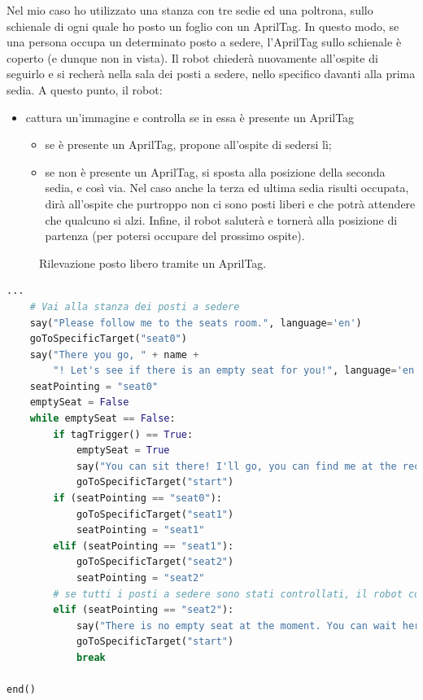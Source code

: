 \documentclass[italian, twoside]{sapthesis} %
\begin{document}
Nel mio caso ho utilizzato una stanza con tre sedie ed una poltrona, sullo schienale di ogni quale ho posto un foglio con un AprilTag. In questo modo, se una persona occupa un determinato posto a sedere, l'AprilTag sullo schienale è coperto (e dunque non in vista). Il robot chiederà nuovamente all'ospite di seguirlo e si recherà nella sala dei posti a sedere, nello specifico davanti alla prima sedia. A questo punto, il robot:
\begin{itemize}
    \item cattura un'immagine e controlla se in essa è presente un AprilTag
	\begin{itemize}
	    \item se è presente un AprilTag, propone all'ospite di sedersi lì;
        \item se non è presente un AprilTag, si sposta alla posizione della seconda sedia, e così via. Nel caso anche la terza ed ultima sedia risulti occupata, dirà all'ospite che purtroppo non ci sono posti liberi e che potrà attendere che qualcuno si alzi. Infine, il robot saluterà e tornerà alla posizione di partenza (per potersi occupare del prossimo ospite).
    \end{itemize}
\end{itemize}

\begin{figure}[H]
    \centering
    \caption{Rilevazione posto libero tramite un AprilTag.}
    \label{fig:rilevazione}
\end{figure}

\begin{lstlisting}[language=Python]
    ...
    # Vai alla stanza dei posti a sedere
    say("Please follow me to the seats room.", language='en')
    goToSpecificTarget("seat0")
    say("There you go, " + name +
        "! Let's see if there is an empty seat for you!", language='en')
    seatPointing = "seat0"
    emptySeat = False
    while emptySeat == False:
        if tagTrigger() == True:
            emptySeat = True
            say("You can sit there! I'll go, you can find me at the reception.", language='en')
            goToSpecificTarget("start")
        if (seatPointing == "seat0"):
            goToSpecificTarget("seat1")
            seatPointing = "seat1"
        elif (seatPointing == "seat1"):
            goToSpecificTarget("seat2")
            seatPointing = "seat2"
        # se tutti i posti a sedere sono stati controllati, il robot comunichera' all'ospite che non c'e' nessun posto vuoto in quel momento
        elif (seatPointing == "seat2"):
            say("There is no empty seat at the moment. You can wait here until another guest stands up. I'll go, you can find me at the reception.", language='en')
            goToSpecificTarget("start")
            break

end()
\end{lstlisting}
\end{document}
